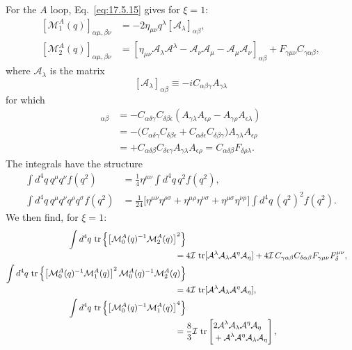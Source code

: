For the $A$ loop, Eq.~\eqref{eq:17.5.15} gives for $\xi=1$:
\begin{align*}
\left[\mathcal M_1^A(q)\right]_{\alpha\mu,\beta\nu}
&=-2\eta_{\mu\nu}q^\lambda[\mathcal A_\lambda]_{\alpha\beta},\\
\left[\mathcal M_2^A(q)\right]_{\alpha\mu,\beta\nu}
&=\left[\eta_{\mu\nu}\mathcal A_\lambda\mathcal A^\lambda
-\mathcal A_\nu\mathcal A_\mu-\mathcal A_\mu\mathcal A_\nu\right]_{\alpha\beta}
+F_{\gamma\mu\nu}C_{\gamma\alpha\beta},
\end{align*}
where $\mathcal A_\lambda$ is the matrix
\[
[\mathcal A_\lambda]_{\alpha\beta}\equiv-iC_{\alpha\beta\gamma}A_{\gamma\lambda}
\]
for which
\begin{align*}
[\mathcal A_\lambda,\mathcal A_\rho]_{\alpha\beta}
&=-C_{\alpha\delta\gamma}C_{\delta\beta\epsilon}
(A_{\gamma\lambda}A_{\epsilon\rho}-A_{\gamma\rho}A_{\epsilon\lambda})\\
&=-\bigl(C_{\alpha\delta\gamma}C_{\delta\beta\epsilon}
+C_{\alpha\delta\epsilon}C_{\delta\beta\gamma}\bigr)
A_{\gamma\lambda}A_{\epsilon\rho}\\
&=+C_{\alpha\delta\beta}C_{\delta\epsilon\gamma}
A_{\gamma\lambda}A_{\epsilon\rho}
=C_{\alpha\delta\beta}F_{\delta\rho\lambda}.
\end{align*}
The integrals have the structure
\begin{align*}
\int d^4q\,q^\mu q^\nu f(q^2)
&=\frac14\eta^{\mu\nu}\int d^4q\,q^2f(q^2),\\
\int d^4q\,q^\mu q^\nu q^\rho q^\sigma f(q^2)
&=\frac1{24}\bigl[\eta^{\mu\nu}\eta^{\rho\sigma}
+\eta^{\mu\rho}\eta^{\nu\sigma}
+\eta^{\mu\sigma}\eta^{\nu\rho}\bigr]
\int d^4q\,(q^2)^2f(q^2).
\end{align*}
We then find, for $\xi=1$:
\begin{align*}
\int d^4q\,\operatorname{tr}\left\{
\left[\mathcal M_0^A(q)^{-1}\mathcal M_2^A(q)\right]^2\right\}
\notag\\[-2pt]
={}&4\mathcal I\,\operatorname{tr}
[\mathcal A^\lambda\mathcal A_\lambda\mathcal A^\eta\mathcal A_\eta]
+4\mathcal I\,C_{\gamma\alpha\beta}C_{\delta\alpha\beta}
F_{\gamma\mu\nu}F_\delta^{\mu\nu},\\
\int d^4q\,\operatorname{tr}\left\{
\left[\mathcal M_0^A(q)^{-1}\mathcal M_1^A(q)\right]^2
\mathcal M_0^A(q)^{-1}\mathcal M_2^A(q)\right\}
\notag\\[-2pt]
={}&4\mathcal I\,\operatorname{tr}
[\mathcal A^\lambda\mathcal A_\lambda\mathcal A^\eta\mathcal A_\eta],\\
\int d^4q\,\operatorname{tr}\left\{
\left[\mathcal M_0^A(q)^{-1}\mathcal M_1^A(q)\right]^4\right\}
\notag\\[-2pt]
={}&\frac83\mathcal I\,\operatorname{tr}
\left[\begin{aligned}
&2\mathcal A^\lambda\mathcal A_\lambda\mathcal A^\eta\mathcal A_\eta\\[-2pt]
&+\mathcal A^\lambda\mathcal A^\eta\mathcal A_\lambda\mathcal A_\eta
\end{aligned}\right],
\end{align*}
